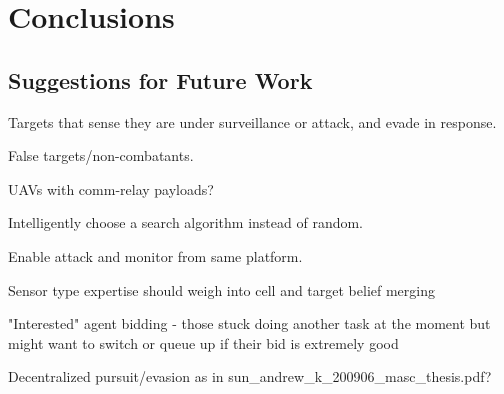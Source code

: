 \chapter{Conclusions}


\section{Suggestions for Future Work}
Targets that sense they are under surveillance or attack, and evade in response.

False targets/non-combatants.

UAVs with comm-relay payloads?

Intelligently choose a search algorithm instead of random.


Enable attack and monitor from same platform.

Sensor type expertise should weigh into cell and target belief merging


"Interested" agent bidding - those stuck doing another task at the moment but might want to switch or queue up if their bid is extremely good


Decentralized pursuit/evasion as in sun\_andrew\_k\_200906\_masc\_thesis.pdf?
